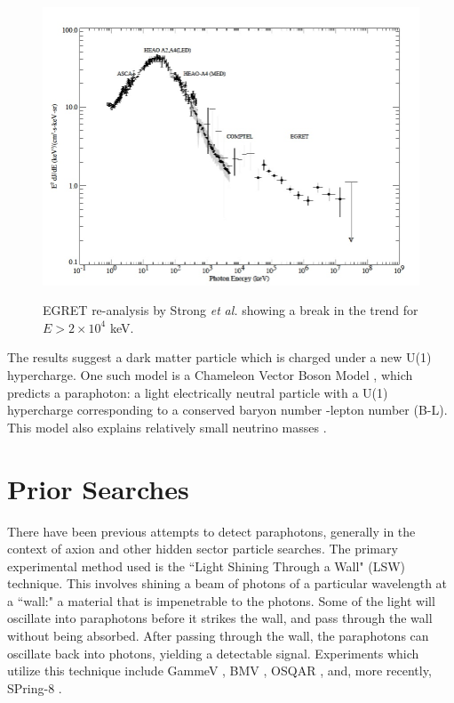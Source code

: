 \begin{figure}
\caption{EGRET re-analysis by Strong \emph{et} \emph{al.} \cite{EG_Strong} showing a break in the trend for $E > 2 \times 10^4$ keV.}
\includegraphics[width=\textwidth]{Paraphotons/EGRET.jpg}
\label{EG_Graph}
\end{figure}

The results suggest a dark matter particle which is charged under a new U(1) hypercharge. One such model is a Chameleon Vector Boson Model \cite{Camo_Vector}, which predicts a paraphoton: a light electrically neutral particle with a U(1) hypercharge corresponding to a conserved baryon number -lepton number (B-L). This model also explains relatively small neutrino masses \cite{Vector_Boson}. 

 \section{Prior Searches}
  There have been previous attempts to detect paraphotons, generally in the context of axion and other hidden sector particle searches. The primary experimental method used is the ``Light Shining Through a Wall" (LSW) technique. This involves shining a beam of photons of a particular wavelength at a ``wall:" a material that is impenetrable to the photons. Some of the light will oscillate into paraphotons before it strikes the wall, and pass through the wall without being absorbed. After passing through the wall, the paraphotons can oscillate back into photons, yielding a detectable signal.  Experiments which utilize this technique include GammeV \cite{GammeV}, BMV \cite{BMV}, OSQAR \cite{OSQAR}, and, more recently, SPring-8 \cite{2013PhLB..722..301I}. 
  
